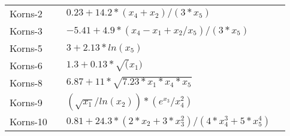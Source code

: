 \begin{table*}[htbp]
\begin{center}
\begin{tabular}{llll}

Korns-2 & \cite{worm2013prioritized} & $0.23+14.2*(x_4+x_2)/(3*x_5)$ &  \\ 
Korns-3 & \cite{worm2013prioritized,sotto2017probabilistic} & $-5.41+4.9*(x_4-x_1+x_2/x_5)/(3*x_5)$ &  \\
Korns-5 & \cite{worm2013prioritized,sotto2017probabilistic} & $3+2.13*ln(x_5)$ &  \\ 
Korns-6 & \cite{worm2013prioritized} & $1.3+0.13*\sqrt(x_1)$ &  \\ 
Korns-8 & \cite{worm2013prioritized} & $6.87+11*\sqrt{7.23*x_1*x_4*x_5}$ &  \\ 
Korns-9 & \cite{worm2013prioritized} & $(\sqrt{x_1}/ln(x_2))*(e^{x_3}/x_4^2)$ &  \\ 
Korns-10 & \cite{worm2013prioritized} & $0.81+24.3*(2*x_2+3*x_3^2)/(4*x_4^3+5*x_5^4)$ &  \\ 


\end{tabular}
\end{center}
\end{table*}
